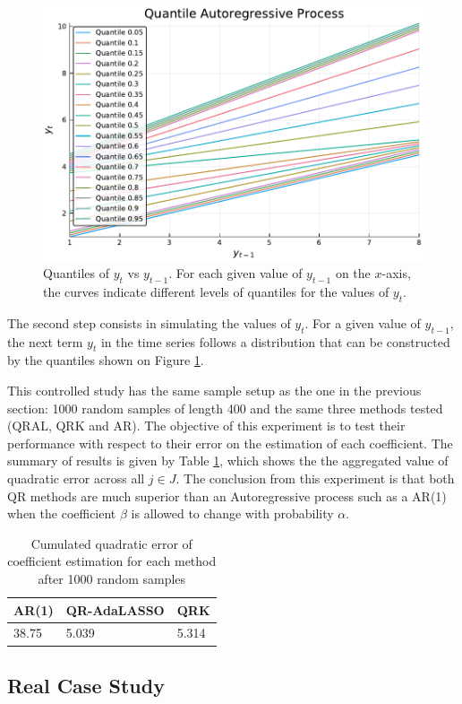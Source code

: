 \begin{figure}[h]
	\centering
	\centerline{\includegraphics[width=0.8\linewidth]{Images/Qar.pdf}}
	\caption{Quantiles of $y_t$ vs $y_{t-1}$. For each given value of $y_{t-1}$ on the $x$-axis, the curves indicate different levels of quantiles for the values of $y_t$.}
	\label{fig:qar}
\end{figure}

The second step consists in simulating the values of $y_t$. For a given value of $y_{t-1}$, the next term $y_t$ in the time series follows a distribution that can be constructed by the quantiles shown on Figure \ref{fig:qar}. 

This controlled study has the same sample setup as the one in the previous section: 1000 random samples of length 400 and the same three methods tested (QRAL, QRK and AR). The objective of this experiment is to test their performance with respect to their error on the estimation of each coefficient. The summary of results is given by Table \ref{tab:qar-results}, which shows the the aggregated value of quadratic error across all $j \in J$.
The conclusion from this experiment is that both QR methods are much superior than an Autoregressive process such as a AR(1) when the coefficient $\beta$ is allowed to change with probability $\alpha$. 


\begin{table}[h]
\centering
\caption{Cumulated quadratic error of coefficient estimation for each method after 1000 random samples}
\label{tab:qar-results}
\begin{tabular}{lll}
\hline
AR(1) & QR-AdaLASSO & QRK   \\ \hline
38.75 & 5.039       & 5.314
\end{tabular}
\end{table}

\subsection{Real Case Study}

